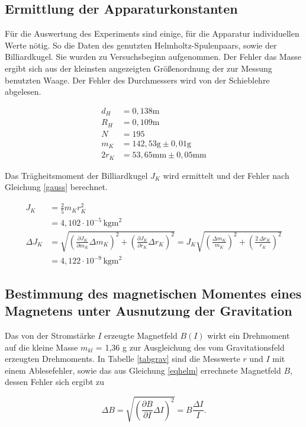 \subsection{Ermittlung der Apparaturkonstanten}
Für die Auswertung des Experiments sind einige, für die Apparatur individuellen Werte nötig. So die Daten des genutzten Helmholtz-Spulenpaars,
sowie der Billiardkugel. Sie wurden zu Versuchsbeginn aufgenommen. Der Fehler das Masse ergibt sich aus der kleinsten angezeigten Größenordnung
der zur Messung benutzten Waage. Der Fehler des Durchmessers wird von der Schieblehre abgelesen.

\begin{align*}
 d_H &= 0,138 \text{m} \\
 R_H &= 0,109 \text{m}\\
 N &= 195\\
 m_K &= 142,53 \text{g} \pm 0,01 \text{g}\\
 2r_K &= 53,65 \text{mm} \pm 0,05 \text{mm}
\end{align*}

Das Trägheitsmoment der Billiardkugel $J_K$ wird ermittelt und der Fehler nach Gleichung \eqref{gauss} berechnet.

\begin{align}
\nonumber
 J_K &= \frac25 m_K r_K^2 \\
 &= 4,102 \cdot 10^{-5} \, \text{kgm}^2\\
 \nonumber
 \Delta J_K &= \sqrt{\left(\frac{\partial J_K}{\partial m_K} \Delta m_K \right)^2 + \left(\frac{\partial J_K}{\partial r_K} \Delta r_K \right)^2 } = J_K \sqrt{\left( \frac{\Delta m_K}{m_K} \right)^2 + \left( \frac{2 \, \Delta r_K}{r_K} \right)^2}\\
 &= 4,122 \cdot 10^{-9} \, \text{kgm}^2
\end{align}

\subsection[Ermittlung durch Ausnutzen der Gravitation]{Bestimmung des magnetischen Momentes eines Magnetens unter Ausnutzung der Gravitation}
Das von der Stromstärke $I$ erzeugte Magnetfeld $B(I)$ wirkt ein Drehmoment auf die kleine Masse $m_{kl}$ = 1,36 g zur Ausgleichung 
des vom Gravitationsfeld erzeugten Drehmoments. In Tabelle \ref{tabgrav} sind die Messwerte $r$ und $I$ mit einem Ablesefehler, sowie das aus 
Gleichung \eqref{eqhelm} errechnete Magnetfeld $B$, dessen Fehler sich ergibt zu

\begin{equation}
 \Delta B = \sqrt{ \left( \frac{\partial B}{\partial I} \Delta I \right)^2 }= B \frac{\Delta I}{I}.
\end{equation}


